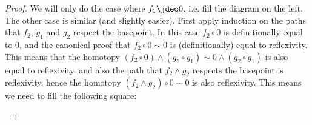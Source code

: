\documentclass{article}
\newcommand{\smsh}{\wedge}
\renewcommand{\o}{\ensuremath{\circ}}
\begin{document}
\begin{proof}
  We will only do the case where $f_1\jdeq 0$, i.e. fill the diagram on the left. The other case is
  similar (and slightly easier). First apply induction on the paths that $f_2$, $g_1$ and $g_2$
  respect the basepoint. In this case $f_2\o0$ is definitionally equal to $0$, and the canonical
  proof that $f_2\o 0\sim0$ is (definitionally) equal to reflexivity. This means that the homotopy
  $(f_2 \o 0)\smsh (g_2 \o g_1)\sim0\smsh (g_2 \o g_1)$ is also equal to reflexivity, and also the
  path that $f_2 \smsh g_2$ respects the basepoint is reflexivity, hence the homotopy
  $(f_2 \smsh g_2)\o 0\sim0$ is also reflexivity. This means we need to fill the following square:
	\begin{center}
	\end{center}


\end{proof}
\end{document}
